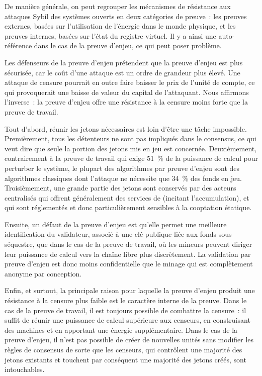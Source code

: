 De manière générale, on peut regrouper les mécanismes de résistance aux attaques Sybil des systèmes ouverts en deux catégories de preuve~: les preuves externes, basées sur l'utilisation de l'énergie dans le monde physique, et les preuves internes, basées sur l'état du registre virtuel. Il y a ainsi une auto-référence dans le cas de la preuve d'enjeu, ce qui peut poser problème.


Les défenseurs de la preuve d'enjeu prétendent que la preuve d'enjeu est plus sécurisée, car le coût d'une attaque est un ordre de grandeur plus élevé. Une attaque de censure pourrait en outre faire baisser le prix de l'unité de compte, ce qui provoquerait une baisse de valeur du capital de l'attaquant. Nous affirmons l'inverse~: la preuve d'enjeu offre une résistance à la censure moins forte que la preuve de travail.

Tout d'abord, réunir les jetons nécessaires est loin d'être une tâche impossible. Premièrement, tous les détenteurs ne sont pas impliqués dans le consensus, ce qui veut dire que seule la portion des jetons mis en jeu est concernée. Deuxièmement, contrairement à la preuve de travail qui exige 51~\% de la puissance de calcul pour perturber le système, le plupart des algorithmes par preuve d'enjeu sont des algorithmes classiques dont l'attaque ne nécessite que 34~\% des fonds en jeu. Troisièmement, une grande partie des jetons sont conservés par des acteurs centralisés qui offrent généralement des services de  (incitant l'accumulation), et qui sont réglementés et donc particulièrement sensibles à la cooptation étatique.

Ensuite, un défaut de la preuve d'enjeu est qu'elle permet une meilleure identification du validateur, associé à une clé publique liée aux fonds sous séquestre, que dans le cas de la preuve de travail, où les mineurs peuvent diriger leur puissance de calcul vers la chaîne libre plus discrètement. La validation par preuve d'enjeu est donc moins confidentielle que le minage qui est complètement anonyme par conception.

Enfin, et surtout, la principale raison pour laquelle la preuve d'enjeu produit une résistance à la censure plus faible est le caractère interne de la preuve. Dans le cas de la preuve de travail, il est toujours possible de combattre la censure~: il suffit de réunir une puissance de calcul supérieure aux censeurs, en construisant des machines et en apportant une énergie supplémentaire. Dans le cas de la preuve d'enjeu, il n'est pas possible de créer de nouvelles unités sans modifier les règles de consensus de sorte que les censeurs, qui contrôlent une majorité des jetons existants et touchent par conséquent une majorité des jetons créés, sont intouchables.


